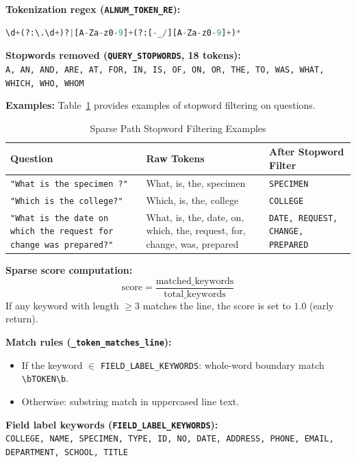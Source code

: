 \documentclass[11pt,a4paper]{article}
\begin{document}
\noindent\textbf{Tokenization regex (\texttt{ALNUM\_TOKEN\_RE}):}
\begin{lstlisting}[language=Python]
\d+(?:\.\d+)?|[A-Za-z0-9]+(?:[-_/][A-Za-z0-9]+)*
\end{lstlisting}

\noindent\textbf{Stopwords removed (\texttt{QUERY\_STOPWORDS}, 18 tokens):} \\
\texttt{A, AN, AND, ARE, AT, FOR, IN, IS, OF, ON, OR, THE, TO, WAS, WHAT, WHICH, WHO, WHOM}

\noindent\textbf{Examples:} Table~\ref{tab:stopword_examples} provides examples of stopword filtering on questions.

\begin{table}[H]
\centering
\caption{Sparse Path Stopword Filtering Examples}
\label{tab:stopword_examples}
\begin{tabular}{|p{6cm}|p{4cm}|p{5cm}|}
\hline
\textbf{Question} & \textbf{Raw Tokens} & \textbf{After Stopword Filter} \\ \hline
\texttt{"What is the specimen ?"} & What, is, the, specimen & \texttt{SPECIMEN} \\ \hline
\texttt{"Which is the college?"} & Which, is, the, college & \texttt{COLLEGE} \\ \hline
\texttt{"What is the date on which the request for change was prepared?"} & What, is, the, date, on, which, the, request, for, change, was, prepared & \texttt{DATE, REQUEST, CHANGE, PREPARED} \\ \hline
\end{tabular}
\end{table}

\noindent\textbf{Sparse score computation:}
\begin{equation}
\text{score} = \frac{\text{matched\_keywords}}{\text{total\_keywords}}
\end{equation}
If any keyword with length $\ge 3$ matches the line, the score is set to $1.0$ (early return).

\noindent\textbf{Match rules (\texttt{\_token\_matches\_line}):}
\begin{itemize}
    \item If the keyword $\in$ \texttt{FIELD\_LABEL\_KEYWORDS}: whole-word boundary match \texttt{\textbackslash bTOKEN\textbackslash b}.
    \item Otherwise: substring match in uppercased line text.
\end{itemize}

\noindent\textbf{Field label keywords (\texttt{FIELD\_LABEL\_KEYWORDS}):} \\
\texttt{COLLEGE, NAME, SPECIMEN, TYPE, ID, NO, DATE, ADDRESS, PHONE, EMAIL, DEPARTMENT, SCHOOL, TITLE}
\end{document}
